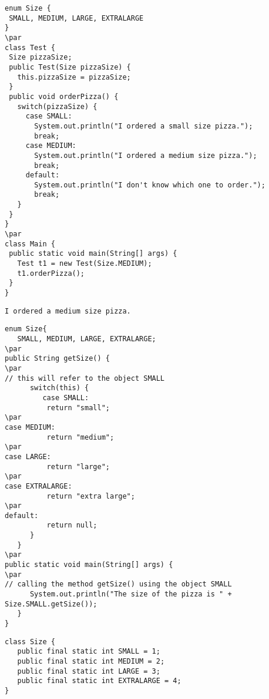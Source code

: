 \documentclass{book}
\def\lthtmlcheckvsize{\ifdim\ht\sizebox<\vsize 
  \ifdim\wd\sizebox<\hsize\expandafter\hfill\fi \expandafter\vfill
  \else\expandafter\vss\fi}%
\begin{document}
{\newpage\clearpage
{}%
\begin{lstlisting}
enum Size {
 SMALL, MEDIUM, LARGE, EXTRALARGE
}
\par
class Test {
 Size pizzaSize;
 public Test(Size pizzaSize) {
   this.pizzaSize = pizzaSize;
 }
 public void orderPizza() {
   switch(pizzaSize) {
     case SMALL:
       System.out.println("I ordered a small size pizza.");
       break;
     case MEDIUM:
       System.out.println("I ordered a medium size pizza.");
       break;
     default:
       System.out.println("I don't know which one to order.");
       break;
   }
 }
}
\par
class Main {
 public static void main(String[] args) {
   Test t1 = new Test(Size.MEDIUM);
   t1.orderPizza();
 }
}
\end{lstlisting}%
\lthtmlfigureZ
\lthtmlcheckvsize\clearpage}

{\newpage\clearpage
{}%
\begin{lstlisting}
I ordered a medium size pizza.
\end{lstlisting}%
\lthtmlfigureZ
\lthtmlcheckvsize\clearpage}

{\newpage\clearpage
{}%
\begin{lstlisting}
enum Size{
   SMALL, MEDIUM, LARGE, EXTRALARGE;
\par
public String getSize() {
\par
// this will refer to the object SMALL
      switch(this) {
         case SMALL:
          return "small";
\par
case MEDIUM:
          return "medium";
\par
case LARGE:
          return "large";
\par
case EXTRALARGE:
          return "extra large";
\par
default:
          return null;
      }
   }
\par
public static void main(String[] args) {
\par
// calling the method getSize() using the object SMALL
      System.out.println("The size of the pizza is " + Size.SMALL.getSize());
   }
}
\end{lstlisting}%
\lthtmlfigureZ
\lthtmlcheckvsize\clearpage}

{\newpage\clearpage
{}%
\begin{lstlisting}
class Size {
   public final static int SMALL = 1;
   public final static int MEDIUM = 2;
   public final static int LARGE = 3;
   public final static int EXTRALARGE = 4;
}
\end{lstlisting}%
\lthtmlfigureZ
\lthtmlcheckvsize\clearpage}
\end{document}
